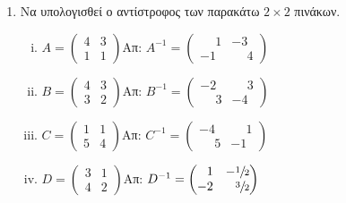 


\pagestyle{askhseis}
\everymath{\displaystyle}






\begin{center}
  \minibox{\large\bf \textcolor{Col1}{Ασκήσεις Αντίστροφος Πίνακας}}
\end{center}

\vspace{\baselineskip}

\begin{enumerate}
  \item Να υπολογισθεί ο αντίστροφος των παρακάτω $2\times 2$ πινάκων.

    \begin{enumerate}[i)]
      \item $A=\begin{pmatrix}
          4 & 3 \\
          1 & 1
          \end{pmatrix}$\hfill Απ: $Α^{-1}=\begin{pmatrix}
          \phantom{-}1 & -3 \\
          -1 & \phantom{-}4
        \end{pmatrix}$

      \item $B=\begin{pmatrix}
          4 & 3 \\
          3 & 2
          \end{pmatrix}$\hfill Απ: $B^{-1}=\begin{pmatrix}
          -2 & \phantom{-}3 \\
          \phantom{-}3 & -4
        \end{pmatrix}$

      \item $C=\begin{pmatrix}
          1 & 1 \\
          5 & 4
          \end{pmatrix}$\hfill Απ: $C^{-1}=\begin{pmatrix}
          -4 & \phantom{-}1 \\
          \phantom{-}5 & -1
        \end{pmatrix}$

      \item $D=\begin{pmatrix}
          3 & 1 \\
          4 & 2
          \end{pmatrix}$\hfill Απ: $D^{-1}=\begin{pmatrix}
          \phantom{-}1 & -\sfrac{1}{2} \\
          -2 & \phantom{-}\sfrac{3}{2}
        \end{pmatrix}$
    \end{enumerate}


\end{enumerate}
